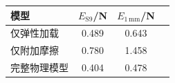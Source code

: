 \begin{table}[!htbp]
\centering
{}
\label{tab:recovery-fit}
\small\setlength{\tabcolsep}{2pt}
\begin{tabular}{lccc}
\toprule
模型 & $E_{\mathrm{S9}}$/N & $E_{1\,\mathrm{mm}}$/N \\
\midrule
仅弹性加载 & 0.489 & 0.643 \\
仅附加摩擦 & 0.780 & 1.458 \\
完整物理模型 & 0.404 & 0.478 \\
\bottomrule
\end{tabular}

\end{table}
